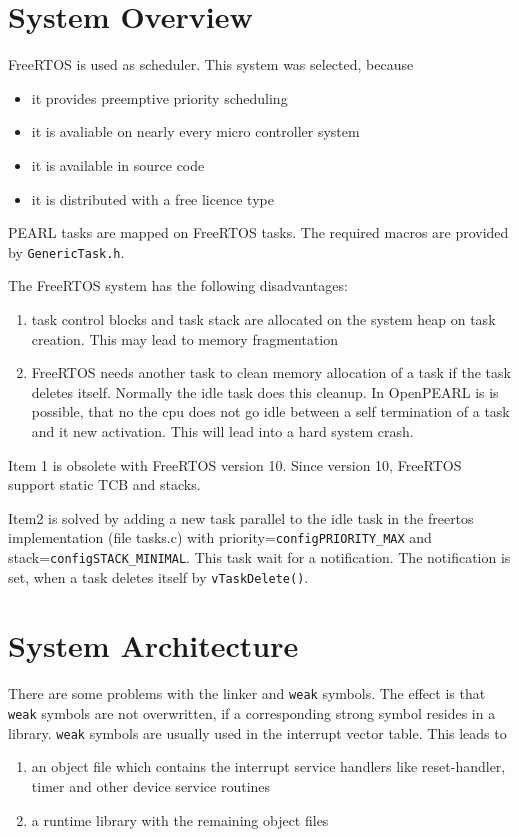 \section{System Overview}
FreeRTOS is used as scheduler. This system was selected, because
\begin{itemize}
\item it provides preemptive priority scheduling
\item it is avaliable on nearly every micro controller system
\item it is available in source code
\item it is distributed with a free licence type
\end{itemize}

PEARL tasks are mapped on FreeRTOS tasks. The required macros
are provided by \texttt{GenericTask.h}.

The FreeRTOS system has the following disadvantages:
\begin{enumerate}
\item task control blocks and task stack are allocated on the system
   heap on task creation. This may lead to memory fragmentation
\item FreeRTOS needs another task to clean memory allocation of a task if 
   the task deletes itself. Normally the idle task does this cleanup.
   In OpenPEARL is is possible, that no the cpu does not go idle 
   between a self termination of a task and it new activation. This 
   will lead into a hard system crash.
\end{enumerate}

Item 1 is obsolete with FreeRTOS version 10.
Since version 10, FreeRTOS support static TCB and stacks.

Item2 is solved by adding a new task parallel  to the idle task 
  in the freertos implementation (file tasks.c) with
  priority=\texttt{configPRIORITY\_MAX} and stack=\texttt{configSTACK\_MINIMAL}.
  This task wait for a notification. The notification is set, when 
  a task deletes itself by \texttt{vTaskDelete()}.


\section{System Architecture}
There are some problems with the linker and \texttt{weak} symbols.
The effect is that \texttt{weak} symbols are not overwritten, if
a corresponding strong symbol resides in a library.
\texttt{weak} symbols are usually used in the interrupt vector table.
This leads to
\begin{enumerate}
\item an object file which contains the interrupt service handlers like
   reset-handler, timer and other device service routines
\item a runtime library with the remaining object files
\end{enumerate}

